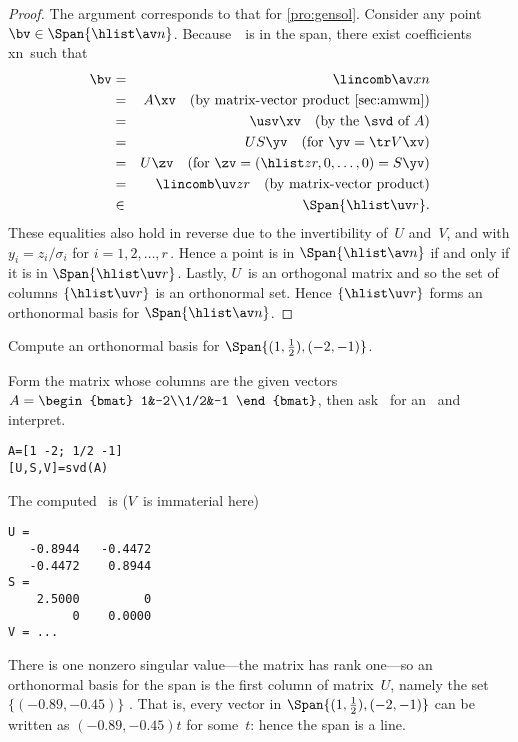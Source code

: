 \begin{proof} 
The argument corresponds to that for \cref{pro:gensol}.
Consider any point \(\bv\in\Span\{\hlist\av n\}\).
Because~\bv\ is in the span, there exist coefficients \hlist xn\ such that
\begin{eqnarray*}
\bv&=&\lincomb \av xn
\\&=&A\xv \quad(\text{by matrix-vector product \cref{sec:amwm}})
\\&=&\usv \xv \quad(\text{by the \svd\ of }A)
\\&=&US \yv \quad(\text{for }\yv=\tr V\xv)
\\&=&U\zv \quad(\text{for }\zv=(\hlist zr,0,\ldots,0)=S\yv)
\\&=&\lincomb \uv z r  \quad(\text{by matrix-vector product})
\\&\in&\Span\{\hlist \uv r\}.
\end{eqnarray*}
These equalities also hold in reverse due to the invertibility of~\(U\) and~\(V\), and with \(y_i=z_i/\sigma_i\) for \(i=1,2,\ldots,r\)\,.
Hence a point is in \(\Span\{\hlist\av n\}\) if and only if it is in \(\Span\{\hlist \uv r\}\).
Lastly, \(U\)~is an orthogonal matrix and so the set of columns \(\{\hlist \uv r\}\) is an orthonormal set.
Hence \(\{\hlist \uv r\}\) forms an orthonormal basis for \(\Span\{\hlist\av n\}\).
\end{proof}


\begin{example} \label{eg:orthspn2}
Compute an orthonormal basis for \(\Span\{(1,\frac12),(-2,-1)\}\).
\begin{solution} 
Form the matrix whose columns are the given vectors
\(A=\begin{bmat} 1&-2\\1/2&-1 \end{bmat}\),
then ask \script\ for an \svd\ and interpret.
\begin{verbatim}
A=[1 -2; 1/2 -1]
[U,S,V]=svd(A)
\end{verbatim}
\setbox\ajrqrbox\hbox{}%
\marginajrbox%
The computed \svd\ is (\(V\)~is immaterial here)
\begin{verbatim}
U =
   -0.8944   -0.4472
   -0.4472    0.8944
S =
    2.5000         0
         0    0.0000
V = ...
\end{verbatim}
There is one nonzero singular value---the matrix has rank one---so an orthonormal basis for the span is the first column of matrix~\(U\), namely the set \(\{(-0.89,-0.45)\}\) \twodp.
That is, every vector in \(\Span\{(1,\frac12),(-2,-1)\}\) can be written as \((-0.89,-0.45)t\) for some~\(t\): hence the span is a line.
\end{solution}
\end{example}


